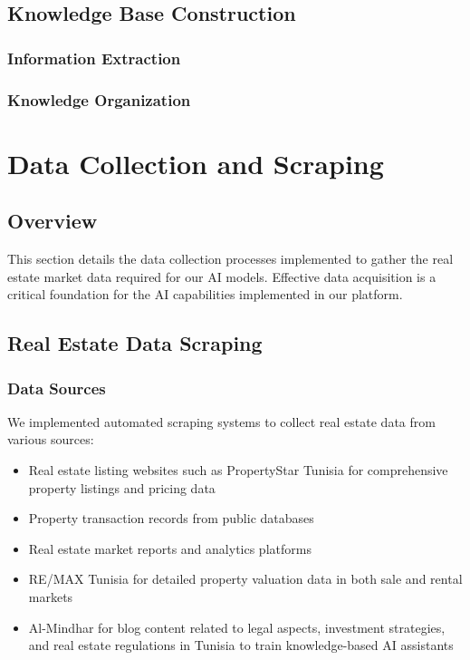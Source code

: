 \subsection{Knowledge Base Construction}
\subsubsection{Information Extraction}


\subsubsection{Knowledge Organization}

\section{Data Collection and Scraping}
\subsection{Overview}
This section details the data collection processes implemented to gather the real estate market data required for our AI models. Effective data acquisition is a critical foundation for the AI capabilities implemented in our platform.

\subsection{Real Estate Data Scraping}
\subsubsection{Data Sources}
We implemented automated scraping systems to collect real estate data from various sources:
\begin{itemize}
    \item Real estate listing websites such as PropertyStar Tunisia \cite{PropertyStarTunisia} for comprehensive property listings and pricing data
    \item Property transaction records from public databases
    \item Real estate market reports and analytics platforms
    \item RE/MAX Tunisia \cite{RemaxTunisia} for detailed property valuation data in both sale and rental markets
    \item Al-Mindhar \cite{AlMindhar} for blog content related to legal aspects, investment strategies, and real estate regulations in Tunisia to train knowledge-based AI assistants
\end{itemize}

